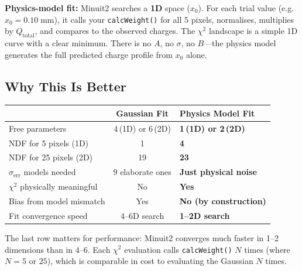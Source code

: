 \documentclass[11pt,a4paper]{article}
\newcommand{\code}[1]{\texttt{#1}}
\begin{document}
\medskip\noindent
\textbf{Physics-model fit:} Minuit2 searches a \textbf{1D} space
($x_0$).  For each trial value (e.g.\ $x_0 = 0.10\;\text{mm}$), it
calls your \code{calcWeight()} for all 5 pixels, normalises, multiplies
by $Q_{\text{total}}$, and compares to the observed charges.  The
$\chi^{2}$ landscape is a simple 1D curve with a clear minimum.
There is no $A$, no $\sigma$, no $B$---the physics model generates the
full predicted charge profile from $x_0$ alone.

\subsection{Why This Is Better}
\label{sec:why-better}

\begin{table}[h]
\centering
\begin{tabular}{@{}lcl@{}}
\toprule
 & \textbf{Gaussian Fit} & \textbf{Physics Model Fit} \\
\midrule
Free parameters          & 4\,(1D) or 6\,(2D)  & \textbf{1\,(1D) or 2\,(2D)} \\
NDF for 5 pixels (1D)    & 1                    & \textbf{4}                   \\
NDF for 25 pixels (2D)   & 19                   & \textbf{23}                  \\
$\sigma_{\text{err}}$ models needed
                         & 9 elaborate ones     & \textbf{Just physical noise} \\
$\chi^{2}$ physically meaningful
                         & No                   & \textbf{Yes}                 \\
Bias from model mismatch & Yes                  & \textbf{No (by construction)} \\
Fit convergence speed    & 4--6D search         & \textbf{1--2D search}         \\
\bottomrule
\end{tabular}
\end{table}

\noindent
The last row matters for performance: Minuit2 converges much faster in
1--2 dimensions than in 4--6.  Each $\chi^{2}$ evaluation calls
\code{calcWeight()} $N$ times (where $N = 5$ or $25$), which is
comparable in cost to evaluating the Gaussian $N$ times.

\end{document}
